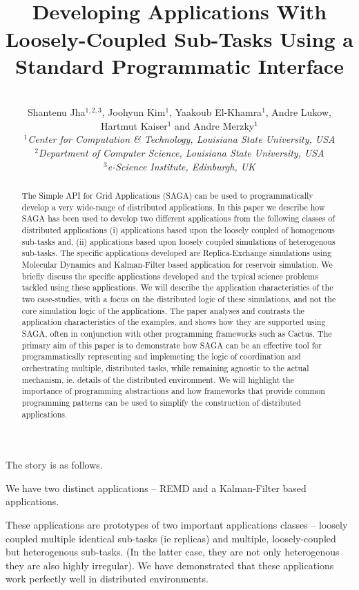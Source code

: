 \documentclass[conference,final]{IEEEtran}
\title{
  ~\\[-3em]
  Developing Applications With Loosely-Coupled Sub-Tasks Using a
  Standard Programmatic Interface}
\author{
    ~\\[-2em]
    Shantenu Jha$^{1,2,3}$, Joohyun Kim$^{1}$,
    Yaakoub El-Khamra$^{1}$, Andre Lukow, \\ 
    Hartmut Kaiser$^{1}$ and Andre Merzky$^{1}$ \\
    \small{\emph{$^{1}$Center for Computation \& Technology, Louisiana State University, USA}}\\
    \small{\emph{$^{2}$Department of Computer Science, Louisiana State
        University, USA}}\\
    \small{\emph{$^{3}$e-Science Institute, Edinburgh, UK}}\\
  }
\begin{document}
 


\maketitle    

\begin{abstract}
  The Simple API for Grid Applications (SAGA) can be used to
  programmatically develop a very wide-range of distributed
  applications.  In this paper we describe how SAGA has been used to
  develop two different applications from the following classes of
  distributed applications (i) applications based upon the loosely
  coupled of homogenous sub-tasks and, (ii) applications based upon
  loosely coupled simulations of heterogenous sub-tasks. The specific
  applications developed are Replica-Exchange simulations using
  Molecular Dynamics and Kalman-Filter based application for reservoir
  simulation.  We briefly discuss the specific applications developed
  and the typical science problems tackled using these applications.
  We will describe the application characteristics of the two
  case-studies, with a focus on the distributed logic of these
  simulations, and not the core simulation logic of the applications.
  The paper analyses and contrasts the application characteristics of
  the examples, and shows how they are supported using SAGA, often in
  conjunction with other programming frameworks such as Cactus.  The
  primary aim of this paper is to demonstrate how SAGA can be an
  effective tool for programmatically representing and implemeting the
  logic of coordination and orchestrating multiple, distributed tasks,
  while remaining agnostic to the actual mechanism, ie. details of the
  distributed environment. We will highlight the importance of
  programming abstractions and how frameworks that provide common
  programming patterns can be used to simplify the construction of
  distributed applications.
\end{abstract}


The story is as follows. 

We have two distinct applications -- REMD and a Kalman-Filter based
applications.

These applications are prototypes of two important applications
classes -- loosely coupled multiple identical sub-tasks (ie replicas)
and multiple, loosely-coupled but heterogenous sub-tasks.  (In the
latter case, they are not only heterogenous they are also highly
irregular).  We have demonstrated that these applications work
perfectly well in distributed environments.
\end{document}
